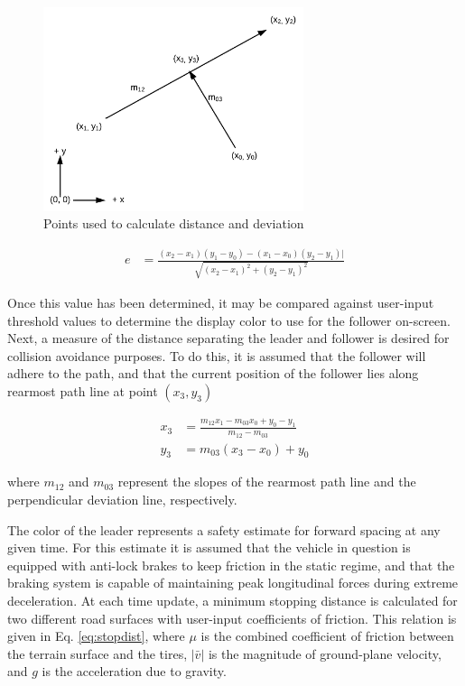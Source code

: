 \documentclass[12pt]{report}
\begin{document}
\begin{figure}[ht] \centering
    \includegraphics[width=3in]{./figs/path_points.png}
    \caption{Points used to calculate distance and deviation}
    \label{fig:pathpts}
\end{figure}

\begin{align} \label{eq:laterr}
    e &= \frac{ (x_2 - x_1)(y_1 - y_0) - (x_1 - x_0)(y_2 - y_1) |} { \sqrt{ (x_2 - x_1)^2 + (y_2 - y_1)^2 } }
\end{align}

Once this value has been determined, it may be compared against user-input threshold values to determine the display color to use for the follower on-screen. Next, a measure of the distance separating the leader and follower is desired for collision avoidance purposes. To do this, it is assumed that the follower will adhere to the path, and that the current position of the follower lies along rearmost path line at point $(x_3, y_3)$

\begin{align} \label{eq:devproj}
    x_3 &= \frac{ m_{12} x_1 - m_{03} x_0 + y_0 - y_1 } { m_{12} - m_{03} } \\
    y_3 &= m_{03} (x_3 - x_0) + y_0
\end{align}

where $m_{12}$ and $m_{03}$ represent the slopes of the rearmost path line and the perpendicular deviation line, respectively.

The color of the leader represents a safety estimate for forward spacing at any given time. For this estimate it is assumed that the vehicle in question is equipped with anti-lock brakes to keep friction in the static regime, and that the braking system is capable of maintaining peak longitudinal forces during extreme deceleration. At each time update, a minimum stopping distance is calculated for two different road surfaces with user-input coefficients of friction. This relation is given in Eq. \ref{eq:stopdist}, where $\mu$  is the combined coefficient of friction between the terrain surface and the tires,  $|\bar{v}|$ is the magnitude of ground-plane velocity, and $g$ is the acceleration due to gravity.
\end{document}
